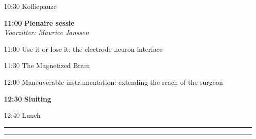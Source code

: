 \documentclass[a4paper,10pt]{report}
\begin{document}
\begin{multicols*}{3}
\begin{packed_enum}
\item[{\color{Blue}{\textbf{09:00}}}]{ }
        \vfill
\item[10:30] Koffiepauze
        \vfill
\item[\textbf{11:00}] {\textbf{Plenaire sessie}}\\\textit{Voorzitter: Maurice Janssen}
\item[11:00] Use it or lose it: the electrode-neuron interface
\item[11:30] The Magnetized Brain
\item[12:00] Maneuverable instrumentation: extending the reach of the surgeon
        \vfill
\item[\textbf{12:30}] \textbf{Sluiting}
\vfill
\item[12:40] Lunch
\end{packed_enum}%


\columnbreak



\vfill
\columnbreak

\hrule\vspace{2mm}
\vspace{2mm}\hrule\strut
\vfill


\end{multicols*}
\end{document}
